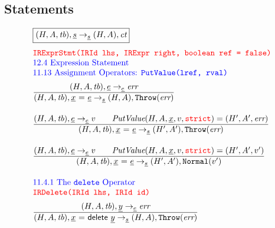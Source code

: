 \subsection{Statements}
\[
\begin{array}{l@{~~}l@{~~}ll}
\fbox{$\state,\ir{\stmt} \rightarrow_{\ir{\stmt}} \res,\ct$}\\[1em]
\mtt{\normalsize\inred IRExprStmt(IRId lhs, IRExpr right, boolean ref = false)}\\

\mbox{\inblue 12.4 Expression Statement}\\
\mbox{\inblue 11.13 Assignment Operators: {\tt PutValue(lref, rval)}}\\[.5em]

\frac{\begin{matrix}
\evale, \ir\expr \rightarrow_{\ir\expr} \err
\end{matrix}}{\begin{matrix}
\state, \irid \ {\tt =} \ \ir\expr \rightarrow_{\ir\stmt}
\res, \error
\end{matrix}}
\\[2em]

\frac{\begin{matrix}
\evale, \ir\expr \rightarrow_{\ir\expr} v
\rulesep
\hf{PutValue}(H,A,\irid,v,\strict) = (H',A',\err)
\end{matrix}}{\begin{matrix}
\state, \irid \ {\tt =} \ \ir\expr \rightarrow_{\ir\stmt}
\resp, \error
\end{matrix}}
\\[2em]

\frac{\begin{matrix}
\evale, \ir\expr \rightarrow_{\ir\expr} v
\rulesep
\hf{PutValue}(H,A,\irid,v,\strict) = (H',A',v')
\end{matrix}}{\begin{matrix}
\state, \irid \ {\tt =} \ \ir\expr \rightarrow_{\ir\stmt}
\resp, {\tt Normal}(v')
\end{matrix}}
\\[2em]


\mbox{\inblue 11.4.1 The {\tt delete} Operator}\\
\mtt{\normalsize\inred IRDelete(IRId lhs, IRId id)}\\[.5em]
\frac{\begin{matrix}
\evale, \ir{y} \rightarrow_{\ir\expr} \err
\end{matrix}}{\begin{matrix}
\state, \irdel \rightarrow_{\ir\stmt} \res, \error
\end{matrix}}
\\[2em]


\end{array}\]
